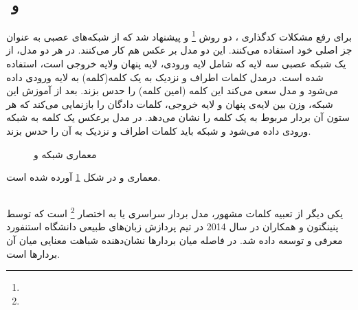 \subsection{‌ و }
	برای رفع مشکلات کدگذاری 
	، دو روش
	\footnote{}
	\cite{mikolov2013efficient}
	و
	\cite{mikolov2013efficient}
	پیشنهاد شد که از شبکه‌های عصبی به عنوان جز اصلی خود استفاده می‌کنند. این دو مدل بر عکس هم کار می‌کنند.	در هر دو مدل، از یک شبکه عصبی سه لایه که شامل لایه ورودی، لایه پنهان ولایه خروجی است، استفاده شده است. درمدل 
	کلمات اطراف و نزدیک به یک کلمه(کلمه) به لایه ورودی داده می‌شود و مدل سعی می‌کند این کلمه (امین کلمه) را حدس بزند.  بعد از آموزش این شبکه‌، وزن بین لایه‌ی پنهان و لایه خروجی، کلمات دادگان را بازنمایی می‌کند که هر ستون آن بردار مربوط به یک کلمه را نشان می‌دهد. در مدل
	برعکس 
	یک کلمه به شبکه ورودی داده می‌شود و شبکه باید کلمات اطراف و نزدیک به آن را حدس بزند. 
	\begin{figure}
		\caption[ 
		و
		]{
			معماری شبکه 
			و
			\cite{mikolov2013efficient}	
		}
		\label{fig:CBOW&skip-gram}
	\end{figure}
	معماری 
	و
	در شکل 
	\ref{fig:CBOW&skip-gram}
	آورده شده است. 

\subsection{}
	یکی دیگر از تعبیه کلمات مشهور، مدل بردار سراسری یا به اختصار 
	\footnote{}
	است که توسط پنینگتون و همکاران 
	\cite{pennington2014glove}
	در سال 2014 در تیم پردازش زبان‌های طبیعی دانشگاه استنفورد معرفی و توسعه داده شد. در 
	فاصله میان بردار‌ها نشان‌دهنده شباهت معنایی میان آن بردارها است.
	
